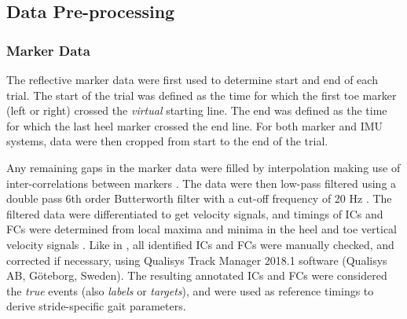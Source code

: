 \documentclass[sensors,article,submit,pdftex,moreauthors]{Definitions/mdpi}
\begin{document}
\subsection{Data Pre-processing \label{subsec:Data_Pre-processing}}
\subsubsection{Marker Data \label{subsubsec:Marker_Data}}
The reflective marker data were first used to determine start and end of each trial. The start of the trial was defined as the time for which the first toe marker (left or right) crossed the \emph{virtual} starting line. The end was defined as the time for which the last heel marker crossed the end line. For both marker and IMU systems, data were then cropped from start to the end of the trial.

Any remaining gaps in the marker data were filled by interpolation making use of inter-correlations between markers \cite{Federolf2013,Gloersen2016}. The data were then low-pass filtered using a double pass 6th order Butterworth filter with a cut-off frequency of 20 Hz \cite{Kormylo1974,Racz2021}. The filtered data were differentiated to get velocity signals, and timings of ICs and FCs were determined from local maxima and minima in the heel and toe vertical velocity signals \cite{Pijnappels2001,OConnor2007}. Like in \cite{Carcreff2018,Romijnders2021}, all identified ICs and FCs were manually checked, and corrected if necessary, using Qualisys Track Manager 2018.1 software (Qualisys AB, Göteborg, Sweden). The resulting annotated ICs and FCs were considered the \emph{true} events (also \emph{labels} or \emph{targets}), and were used as reference timings to derive stride-specific gait parameters.
\end{document}
